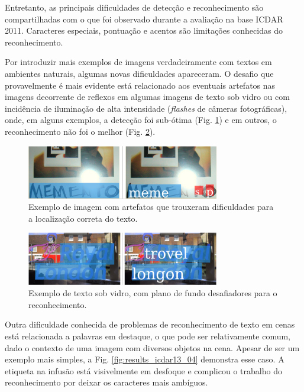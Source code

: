 Entretanto, as principais dificuldades de detecção e reconhecimento são compartilhadas com o que foi observado durante a avaliação na base ICDAR 2011. Caracteres especiais, pontuação e acentos são limitações conhecidas do reconhecimento.

Por introduzir mais exemplos de imagens verdadeiramente com textos em ambientes naturais, algumas novas dificuldades apareceram. O desafio que provavelmente é mais evidente está relacionado aos eventuais artefatos nas imagens decorrente de reflexos em algumas imagens de texto sob vidro ou com incidência de iluminação de alta intensidade (\textit{flashes} de câmeras fotográficas), onde, em alguns exemplos, a detecção foi sub-ótima (Fig. \ref{fig:results_icdar13_03}) e em outros, o reconhecimento não foi o melhor (Fig. \ref{fig:results_icdar13_02}).

\begin{figure}
    \centering
    \includegraphics[width=0.75\textwidth]{figs/resultados-icdar13-03.png}
    \caption{Exemplo de imagem com artefatos que trouxeram dificuldades para a localização correta do texto.}
    \label{fig:results_icdar13_03}
\end{figure}

\begin{figure}
    \centering
    \includegraphics[width=0.75\textwidth]{figs/resultados-icdar13-02.png}
    \caption{Exemplo de texto sob vidro, com plano de fundo desafiadores para o reconhecimento.}
    \label{fig:results_icdar13_02}
\end{figure}

Outra dificuldade conhecida de problemas de reconhecimento de texto em cenas está relacionada a palavras em destaque, o que pode ser relativamente comum, dado o contexto de uma imagem com diversos objetos na cena. Apesar de ser um exemplo mais simples, a Fig. \ref{fig:results_icdar13_04} demonstra esse caso. A etiqueta na infusão está visivelmente em desfoque e complicou o trabalho do reconhecimento por deixar os caracteres mais ambíguos.

